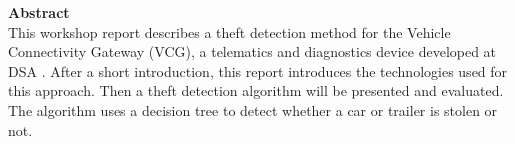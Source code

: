 \vspace*{2cm}
\vspace{10ex}
{\bf\Large Abstract} \\ [1em]

This workshop report describes a theft detection method for the Vehicle Connectivity Gateway (VCG), a telematics and diagnostics device developed at DSA \cite{VCG}. After a short introduction, this report introduces the technologies used for this approach. Then a theft detection algorithm will be presented and evaluated. The algorithm uses a decision tree to detect whether a car or trailer is stolen or not. 

\cleardoublepage

